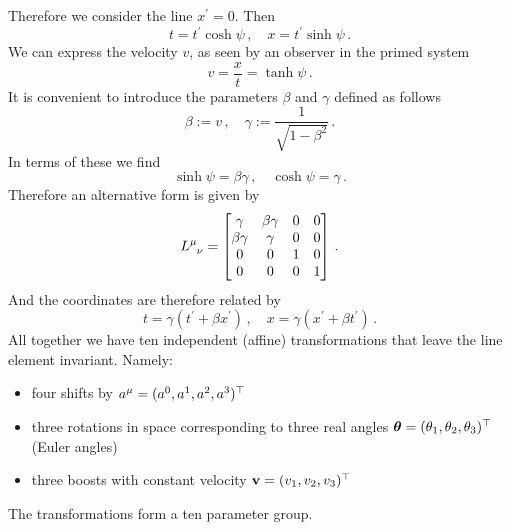 Therefore we consider the line $x^\prime= 0$.
Then
\begin{equation}
    t=t^\prime\cosh\psi\, ,\quad
    x=t^\prime\sinh\psi\, .
\end{equation}
We can express the velocity $v$, as seen by an observer in the primed system
\begin{equation}
    v=\frac{x}{t}=\tanh\psi\,.
\end{equation}
It is convenient to introduce the parameters $\beta$ and $\gamma$ defined as
follows
\begin{equation}
    \beta:=v\, ,\quad\gamma:=\frac{1}{\sqrt{1-\beta^2}}\, .
\end{equation}
In terms of these we find
\begin{equation}
    \sinh\psi = \beta\gamma\, , \quad \cosh\psi=\gamma\,.
\end{equation}
Therefore an alternative form is given by
\begin{equation}
    \tensor{L}{^\mu_\nu}=\begin{bmatrix}
\gamma&\beta\gamma & 0&0\\
\beta\gamma&\gamma &0&0\\
0&0&1 &0\\
0&0 &0 &1
\end{bmatrix}\, .
\end{equation}
And the coordinates are therefore related by
\begin{equation}
    t=\gamma\left(t^\prime+\beta x^\prime\right)\,,\quad
    x=\gamma\left(x^\prime+\beta t^\prime\right)\, .
\end{equation}
All together we have ten independent (affine) transformations that leave the
line element invariant. Namely:
\begin{itemize}
    \item four shifts by $a^\mu=(a^0,a^1,a^2,a^3)^\top$
    \item three rotations in space corresponding to three real angles
    $\boldsymbol{\theta}=(\theta_1,\theta_2,\theta_3)^\top$ (Euler angles)
    \item three boosts with constant velocity $\mathbf{v}=(v_1,v_2,v_3)^\top$
\end{itemize}
The  transformations form a ten parameter group.

